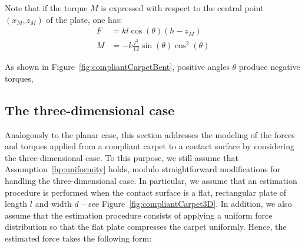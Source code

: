\documentclass{article}
\begin{document}
Note that if the torque $M$ is expressed with respect to the central point $(x_M,z_M)$ of the plate, one has:
\begin{subequations}
    \begin{alignat}{2}
        F &=kl\cos(\theta)\left(h-z_M \right) \\
        M &= -k
          \frac{l^3}{12} \sin(\theta)\cos^2(\theta) 
    \end{alignat}
\end{subequations}

As shown in Figure~\ref{fig:compliantCarpetBent},
positive angles $\theta$ produce negative torques, 

\subsection{The three-dimensional case}
Analogously to the planar case, this section addresses the modeling of the forces and torques applied from a compliant carpet to a contact surface by considering the three-dimensional case. To this purpose, we still assume that Assumption~\ref{hp:uniformity} holds, modulo straightforward modifications for handling the three-dimensional case. In particular, we assume that an estimation procedure is performed when the contact surface is a flat, rectangular plate of length $l$ and width $d$ -- see Figure~\ref{fig:compliantCarpet3D}. In addition, we also assume that the estimation procedure consists of applying  a uniform force distribution  so that  the flat plate compresses the carpet uniformly. Hence, the estimated force takes the following form:
\end{document}
